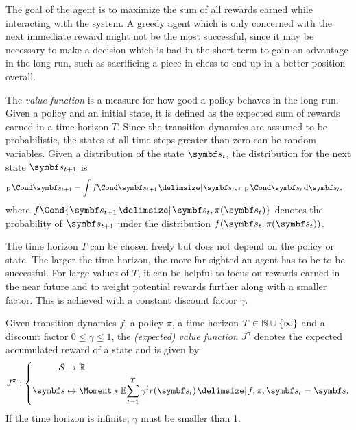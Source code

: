 The goal of the agent is to maximize the sum of all rewards earned while interacting with the system.
A greedy agent which is only concerned with the next immediate reward might not be the most successful, since it may be necessary to make a decision which is bad in the short term to gain an advantage in the long run, such as sacrificing a piece in chess to end up in a better position overall.

The \emph{value function} is a measure for how good a policy behaves in the long run.
Given a policy and an initial state, it is defined as the expected sum of rewards earned in a time horizon $T$.
Since the transition dynamics are assumed to be probabilistic, the states at all time steps greater than zero can be random variables.
Given a distribution of the state $\mat{s_t}$, the distribution for the next state $\mat{s_{t+1}}$ is
\begin{align}
    \Prob{\mat{s_{t+1}}} &= \int \Fun{f}{\mat{s_{t+1}} \given \mat{s_t}, \pi}\Prob{\mat{s_t}} \diff \mat{s_t},
\end{align}
where $f\Cond{\mat{s_{t+1}} \given \mat{s_t}, \pi(\mat{s_t})}$ denotes the probability of $\mat{s_{t+1}}$ under the distribution $f(\mat{s_t}, \pi(\mat{s_t}))$.

The time horizon $T$ can be chosen freely but does not depend on the policy or state.
The larger the time horizon, the more far-sighted an agent has to be to be successful.
For large values of $T$, it can be helpful to focus on rewards earned in the near future and to weight potential rewards further along with a smaller factor.
This is achieved with a constant discount factor $\gamma$.
\begin{definition}
    \label{def:old_value_function}
    Given transition dynamics $f$, a policy $\pi$, a time horizon $T \in \mathbb{N} \cup \left\{ \infty \right\}$ and a discount factor $0 \leq \gamma \leq 1$, the \emph{(expected) value function $J^\pi$} denotes the expected accumulated reward of a state and is given by
    \begin{align}
        J^\pi : \left\{
            \begin{aligned}
                \Es &\to \R \\
                \mat{s} &\mapsto \Moment*{\E}{\sum_{t=1}^T \gamma^t r(\mat{s}_t) \given f, \pi, \mat{s}_t = \mat{s}}.
            \end{aligned}
        \right.
    \end{align}
    If the time horizon is infinite, $\gamma$ must be smaller than 1.
\end{definition}

